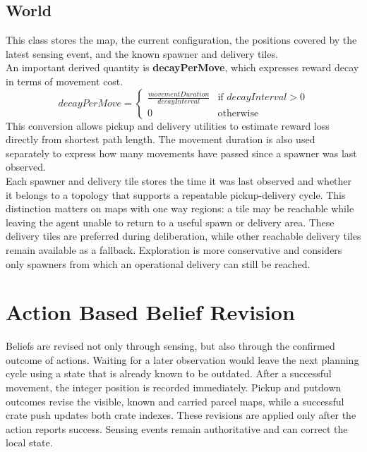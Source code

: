 \documentclass[11pt,a4paper]{article}
\begin{document}
\subsection{World}
This class stores the map, the current configuration, the positions covered by the latest sensing event, and the known spawner and delivery tiles.
\\An important derived quantity is \textbf{decayPerMove}, which expresses reward decay in terms of movement cost.
\begin{equation*}
    decayPerMove=
    \begin{cases}
        \frac{movementDuration}{decayInterval} & \text{if } decayInterval > 0 \\
        0 & \text{otherwise}
    \end{cases}
\end{equation*}
This conversion allows pickup and delivery utilities to estimate reward loss directly from shortest path length. 
The movement duration is also used separately to express how many movements have passed since a spawner was last observed.
\\Each spawner and delivery tile stores the time it was last observed and whether it belongs to a topology that supports a repeatable pickup-delivery cycle.
This distinction matters on maps with one way regions: a tile may be reachable while leaving the agent unable to return to a useful spawn or delivery area.
These delivery tiles are preferred during deliberation, while other reachable delivery tiles remain available as a fallback. 
Exploration is more conservative and considers only spawners from which an operational delivery can still be reached.

\section{Action Based Belief Revision}
Beliefs are revised not only through sensing, but also through the confirmed outcome of actions. 
Waiting for a later observation would leave the next planning cycle using a state that is already known to be outdated.
After a successful movement, the integer position is recorded immediately. 
Pickup and putdown outcomes revise the visible, known and carried parcel maps, while a successful crate push updates both crate indexes. 
These revisions are applied only after the action reports success.
Sensing events remain authoritative and can correct the local state.
\end{document}
